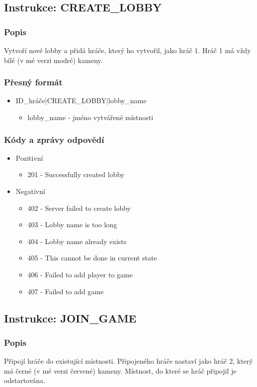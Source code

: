 \documentclass[12pt]{report}
\begin{document}
\subsection{Instrukce: CREATE\_LOBBY}
\subsubsection{Popis}
Vytvoří nové lobby a přidá hráče, který ho vytvořil, jako hráč 1. Hráč 1 má vždy
bílé (v mé verzi modré) kameny.

\subsubsection{Přesný formát}
\begin{itemize}
	\item ID\_hráče$|$CREATE\_LOBBY$|$lobby\_name
		\begin{itemize}
			\item lobby\_name - jméno vytvářené místnosti
		\end{itemize}
\end{itemize}

\subsubsection{Kódy a zprávy odpovědí}
\begin{itemize}
	\item Pozitivní
		\begin{itemize}
			\item 201 - Successfully created lobby
		\end{itemize}
	\item Negativní
		\begin{itemize}
			\item 402 - Server failed to create lobby
			\item 403 - Lobby name is too long
			\item 404 - Lobby name already exists
			\item 405 - This cannot be done in current state
			\item 406 - Failed to add player to game
			\item 407 - Failed to add game
		\end{itemize}
\end{itemize}
%
%
%
\subsection{Instrukce: JOIN\_GAME}
\subsubsection{Popis}
Připojí hráče do existující místnosti. Připojeného hráče nastaví jako hráč 2, který má
černé (v mé verzi červené) kameny. Místnost, do které se hráč připojil je odstartována.
\end{document}
